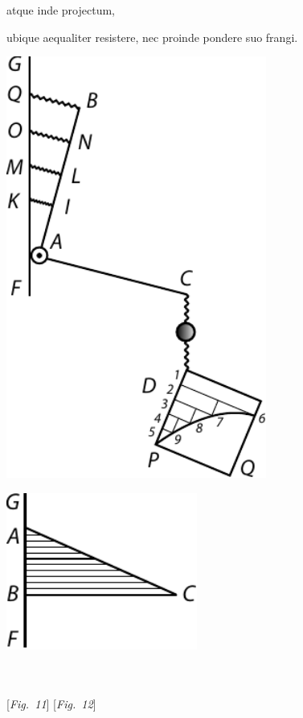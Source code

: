 %
atque inde projectum,\rule[0mm]{0pt}{5,0mm}
ubique aequaliter resistere,\protect{}
nec proinde pondere suo frangi.%
%
%
%
\pend
\pstart \vspace{2em} \noindent
\begin{minipage}[t]{0.5\textwidth}
\hspace{10mm}
\includegraphics[width=0.64\textwidth]{gesamttex/edit_VIII,3/images/LH_37_03_073-074_d11.pdf}
\end{minipage}
\hspace{23mm}
\begin{minipage}[t]{0.5\textwidth}
\includegraphics[width=0.47\textwidth]{gesamttex/edit_VIII,3/images/LH_37_03_073-074_d12.pdf}
\end{minipage}
\\
\\
\vspace{1.5em}
\hspace{23mm} [\textit{Fig.~11}] \label{LH_37_03_074v_d11}\hspace{60mm} [\textit{Fig.~12}] \label{LH_37_03_074v_d12}
\pend

